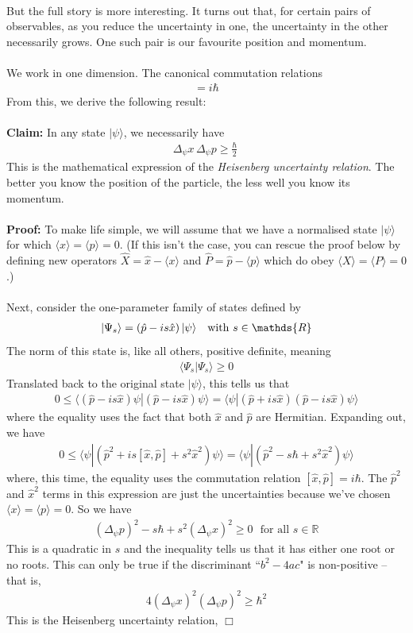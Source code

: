 \documentclass[12pt]{article}
\def\be{\begin{eqnarray}}
\def\ee{\end{eqnarray}}
\newcommand{\nn}{\nonumber}
\newcommand\para{\paragraph{}}
\newcommand{\ket}[1]{|#1\rangle}
\newcommand{\bra}[1]{\langle#1|}
\newcommand{\co}{\color{olive}}
\begin{document}
{\para
But the full story is more interesting. It turns out  that, for certain pairs of observables, as you reduce the uncertainty in one, the uncertainty in the other necessarily grows. One such pair is our favourite position and momentum. 

\para
{\co We work in one dimension. The canonical commutation relations 
%
\be [\hat{x},\hat{p}] = i\hbar\nn\ee
%
From this, we derive the following result:
%
\\ {\ }\\
{\bf Claim:} In any state $\ket{\psi}$, we necessarily have
%
\be \Delta_\psi x\,\Delta_\psi p \geq \frac{\hbar}{2} \ \nn
\ee
%
This is the mathematical expression of the {\it Heisenberg uncertainty relation}. The better you know the position of the particle, the less well you know its momentum.
%
\\ {\ }\\
%
{\bf Proof:} To make life simple, we will assume that we have a  normalised state $\ket{\psi}$ for which $\langle{x}\rangle=\langle{p}\rangle=0$. (If this isn't the case, you can rescue the proof below by defining new operators  $\hat{X} = \hat{x} -\langle{x}\rangle$ and $\hat{P} = \hat{p} -\langle{p}\rangle$ which do obey $\langle{X}\rangle = \langle{P}\rangle=0$.)

\para
Next, consider the one-parameter family of states defined by
%
\be \ket{\Psi_s}= (\hat{p} - is\hat{x})\,\ket{\psi}\ \ \ {\rm with}\  s\in\mathds{R}\nn\ee
%
The norm of this state is, like all others, positive definite, meaning 
%
\be \bra{\Psi_s}{\Psi_s}\rangle \geq 0\nn\ee
%
Translated back to the original state $\ket{\psi}$, this tells us that
%
\be 0 \leq \bra{(\hat{p}-is\hat{x})\psi}{(\hat{p}-is\hat{x})\psi}\rangle  = \bra{\psi}{(\hat{p}+is\hat{x})(\hat{p}-is\hat{x})\psi}\rangle\nn\ee
%
where the equality uses the fact that both $\hat{x}$ and $\hat{p}$ are Hermitian. Expanding out, we have
%
\be 
 0\leq \bra{\psi}{(\hat{p}^2+is[\hat{x},\hat{p}] + s^2\hat{x}^2)\psi}\rangle =\bra{\psi}{(\hat{p}^2 -s\hbar + s^2\hat{x}^2)\psi}\rangle\nn  \ee
 where, this time, the equality uses the commutation relation $[\hat{x},\hat{p}]=i\hbar$.  The $\hat{p}^2$ and $\hat{x}^2$ terms in this expression are just the uncertainties because we've chosen $\langle{x}\rangle=\langle{p}\rangle=0$. So we have
 \be (\Delta_\psi p)^2 -s\hbar + s^2(\Delta_\psi x)^2 \geq 0 \ \ \ \mbox{for all $s\in\mathds{R}$}\nn\ee
 This is a quadratic in $s$ and the inequality tells us that it has either one  root or no roots. This can only be true if the discriminant ``$b^2-4ac$" is non-positive -- that is,
 \be 4(\Delta_\psi x)^2(\Delta_\psi p)^2\geq \hbar^2\nn\ee
 This is the Heisenberg uncertainty relation, \hfill $\Box$
 }
 
}
\end{document}
